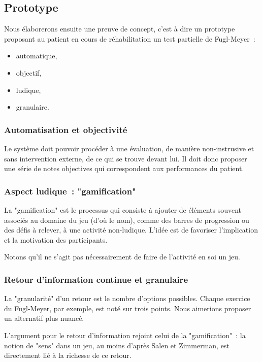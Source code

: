 \documentclass[french,12pt]{report}
\begin{document}
		\subsection{Prototype}
		Nous élaborerons ensuite une preuve de concept, c'est à dire un 
		prototype proposant au patient en cours de réhabilitation un test partielle 
		de Fugl-Meyer~:
		\begin{itemize}
		\item automatique,
		\item objectif, 
		\item ludique,
		\item granulaire.
		\end{itemize}
		
		\subsubsection{Automatisation et objectivité}
		Le système doit pouvoir procéder à une évaluation, de manière non-instrusive 
		et sans intervention externe, de ce qui se trouve devant lui. Il doit donc 
		proposer une série de notes objectives qui correspondent aux performances du 
		patient.
	
		\subsubsection{Aspect ludique~: "gamification"}
		La "gamification" est le processus qui consiste à ajouter de éléments 
		souvent associés au domaine du jeu (d'où le nom), comme des barres de
		progression ou des défis à relever, à une activité non-ludique. L'idée est 
		de favoriser l'implication et la motivation des participants. 
		
		Notons qu'il ne s'agit pas nécessairement de faire de l'activité en soi un 
		jeu.
		
		
    \subsubsection{Retour d'information continue et granulaire}
    La "granularité" d'un retour est le nombre d'options possibles. 
    Chaque exercice du Fugl-Meyer, par exemple, est noté sur trois points. Nous 
    aimerions proposer un alternatif plus nuancé.
    
    L'argument pour le retour d'information rejoint celui de la "gamification"~:
    la notion de "sens" dans un jeu, au moins d'après Salen et Zimmerman, est 
    directement lié à la richesse de ce retour.
    
\end{document}

